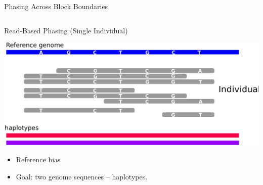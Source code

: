 \documentclass[notes=hide]{beamer}
\begin{document}
\begin{frame}{Phasing Across Block Boundaries}
\begin{columns}[]
\begin{column}{\textwidth}
	\end{column}
		\end{columns}
	
	
\end{frame}

\begin{frame}{Read-Based Phasing (Single Individual)}
\begin{center}
\includegraphics[scale=.35]{figs/sih-phasing-complete-assembly.pdf}
\end{center}
\begin{itemize}
 \item Reference bias
 \item Goal: two genome sequences -- haplotypes.
\end{itemize}
\end{frame}
\end{document}
